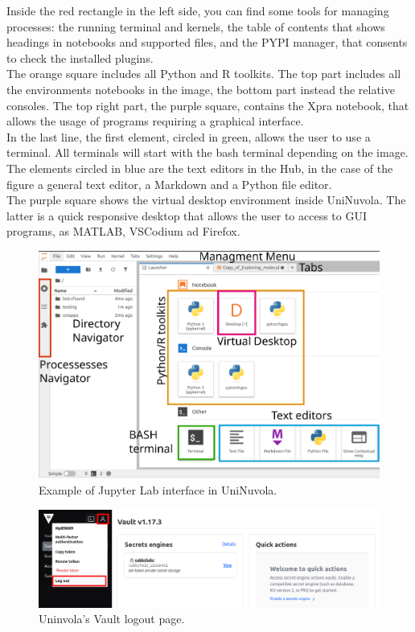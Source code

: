 Inside the red rectangle in the left side, you can find some tools for managing processes: the running terminal and kernels, the table of contents that shows headings in notebooks and supported files, and the PYPI manager, that consents to check the installed plugins. \\ 

The orange square includes all Python and R toolkits. The top part includes all the environments notebooks in the image,
the bottom part instead the relative consoles. The top right part, the purple square, contains the Xpra notebook, that
allows the usage of programs requiring a graphical interface.  \\

In the last line, the first element, circled in green, allows the user to use a terminal. All terminals will start with
the bash terminal depending on the image. The elements circled in blue are the text editors in the Hub,  in the case
of the figure a general text editor, a Markdown and a Python file editor. \\

The purple square shows the virtual desktop environment inside UniNuvola. The latter is a quick responsive desktop that allows the user to access to GUI programs, as MATLAB, VSCodium ad Firefox. \\

\begin{figure}[!ht]
    \centering
    \includegraphics[width=0.8\linewidth]{img/uninuvola.pdf}
    \caption{Example of Jupyter Lab interface in UniNuvola.}
    \label{fig:uninuvola_main_page}
\end{figure}

\begin{figure}[!h]
    \center
    \includegraphics[width=0.8\linewidth]{img/vault.png}
    \caption{Uninvola's Vault logout page.}
    \label{img:logout}
\end{figure}
